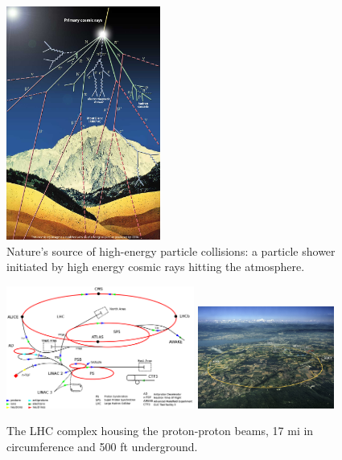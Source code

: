 \begin{figure}[hb!]
\centering
\includegraphics[width=0.45\textwidth]{figs/cosmic-rays.jpg}
\caption[High energy cosmic rays in the atmosphere.]{Nature's source of high-energy particle collisions: a particle shower initiated by high energy cosmic rays hitting the atmosphere.}
\label{fig:cosmicrays}
\end{figure}

\begin{figure}[hb!]
\centering
\includegraphics[width=0.55\textwidth]{figs/lhcschematic.png}
\includegraphics[width=0.4\textwidth]{figs/lhc.jpg}
\caption[The LHC complex.]{The LHC complex housing the proton-proton beams, 17 mi in circumference and 500 ft underground.}
\label{fig:lhc}
\end{figure}
